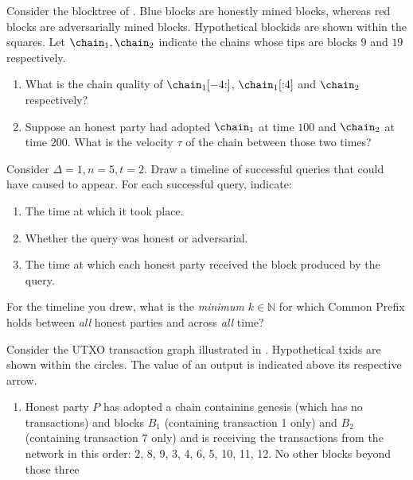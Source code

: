 \begin{problems}
  \item Consider the blocktree of . Blue blocks are honestly
        mined blocks, whereas red blocks are adversarially mined blocks.
        Hypothetical blockids are shown within the squares. Let
        $\chain_1, \chain_2$ indicate the chains whose tips are blocks $9$ and
        $19$ respectively.
        \begin{enumerate}
          \item What is the chain quality of $\chain_1[-4{:}]$, $\chain_1[{:}4]$
                and $\chain_2$ respectively?
          \item Suppose an honest party had adopted $\chain_1$ at time $100$ and
                $\chain_2$ at time $200$. What is the velocity $\tau$ of the
                chain between those two times?
        \end{enumerate}
  \item Consider $\Delta = 1, n = 5, t = 2$. Draw a timeline of successful
        queries that could have caused  to appear.
        For each successful query, indicate:
        \begin{enumerate}
          \item The time at which it took place.
          \item Whether the query was honest or adversarial.
          \item The time at which each honest party received the block produced
                by the query.
        \end{enumerate}
        For the timeline you drew, what is the \emph{minimum} $k \in \mathbb{N}$
        for which Common Prefix holds between \emph{all} honest parties and
        across \emph{all} time?
  \item Consider the UTXO transaction graph illustrated in .
        Hypothetical txids are shown within the circles. The value of an output
        is indicated above its respective arrow. \label{problem.tx-graph}
        \begin{enumerate}
          \item Honest party $P$ has adopted a chain containins genesis (which
                has no transactions) and blocks $B_1$ (containing transaction 1
                only) and $B_2$ (containing transaction $7$ only) and is
                receiving the transactions from the network in this order: 2, 8,
                9, 3, 4, 6, 5, 10, 11, 12. No other blocks beyond those three

\end{enumerate}
\end{problems}
